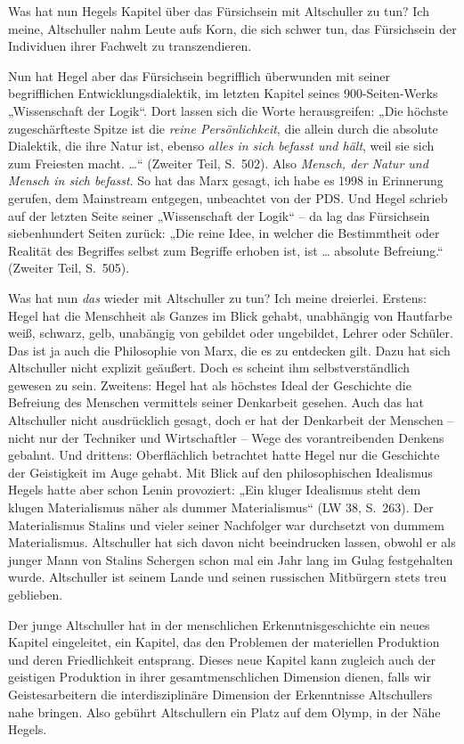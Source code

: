 \documentclass[12pt,a4paper]{article}
\begin{document}
Was hat nun Hegels Kapitel über das Fürsichsein mit Altschuller zu tun? Ich
meine, Altschuller nahm Leute aufs Korn, die sich schwer tun, das Fürsichsein
der Individuen ihrer Fachwelt zu transzendieren.

Nun hat Hegel aber das Fürsichsein begrifflich überwunden mit seiner
begrifflichen Entwicklungsdialektik, im letzten Kapitel seines 900-Seiten-Werks
„Wissenschaft der Logik“. Dort lassen sich die Worte herausgreifen: „Die
höchste zugeschärfteste Spitze ist die \emph{reine Persönlichkeit}, die allein
durch die absolute Dialektik, die ihre Natur ist, ebenso \emph{alles in sich
  befasst und hält}, weil sie sich zum Freiesten macht. …“ (Zweiter Teil,
S.~502). Also \emph{Mensch, der Natur und Mensch in sich befasst}. So hat das
Marx gesagt, ich habe es 1998 in Erinnerung gerufen, dem Mainstream entgegen,
unbeachtet von der PDS. Und Hegel schrieb auf der letzten Seite seiner
„Wissenschaft der Logik“ – da lag das Fürsichsein siebenhundert Seiten zurück:
„Die reine Idee, in welcher die Bestimmtheit oder Realität des Begriffes selbst
zum Begriffe erhoben ist, ist … absolute Befreiung.“ (Zweiter Teil, S.~505).

Was hat nun \emph{das} wieder mit Altschuller zu tun? Ich meine dreierlei.
Erstens: Hegel hat die Menschheit als Ganzes im Blick gehabt, unabhängig von
Hautfarbe weiß, schwarz, gelb, unabängig von gebildet oder ungebildet, Lehrer
oder Schüler.  Das ist ja auch die Philosophie von Marx, die es zu entdecken
gilt.  Dazu hat sich Altschuller nicht explizit geäußert. Doch es scheint ihm
selbstverständlich gewesen zu sein. Zweitens: Hegel hat als höchstes Ideal der
Geschichte die Befreiung des Menschen vermittels seiner Denkarbeit gesehen.
Auch das hat Altschuller nicht ausdrücklich gesagt, doch er hat der Denkarbeit
der Menschen – nicht nur der Techniker und Wirtschaftler – Wege des
vorantreibenden Denkens gebahnt. Und drittens: Oberflächlich betrachtet hatte
Hegel nur die Geschichte der Geistigkeit im Auge gehabt. Mit Blick auf den
philosophischen Idealismus Hegels hatte aber schon Lenin provoziert: „Ein
kluger Idealismus steht dem klugen Materialismus näher als dummer
Materialismus“ (LW 38, S.~263). Der Materialismus Stalins und vieler seiner
Nachfolger war durchsetzt von dummem Materialismus. Altschuller hat sich davon
nicht beeindrucken lassen, obwohl er als junger Mann von Stalins Schergen schon
mal ein Jahr lang im Gulag festgehalten wurde. Altschuller ist seinem Lande und
seinen russischen Mitbürgern stets treu geblieben.

Der junge Altschuller hat in der menschlichen Erkenntnisgeschichte ein neues
Kapitel eingeleitet, ein Kapitel, das den Problemen der materiellen Produktion
und deren Friedlichkeit entsprang. Dieses neue Kapitel kann zugleich auch der
geistigen Produktion in ihrer gesamtmenschlichen Dimension dienen, falls wir
Geistesarbeitern die interdisziplinäre Dimension der Erkenntnisse Altschullers
nahe bringen. Also gebührt Altschullern ein Platz auf dem Olymp, in der Nähe
Hegels.
\end{document}
